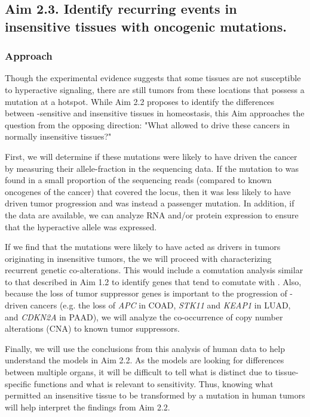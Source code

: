 
\subsection*{Aim 2.3. Identify recurring events in insensitive tissues with oncogenic \KRAS{} mutations.}

\subsubsection*{Approach}

Though the experimental evidence suggests that some tissues are not susceptible to hyperactive \kras{} signaling, there are still tumors from these locations that possess a mutation at a \KRAS{} hotspot.
While Aim 2.2 proposes to identify the differences between \KRAS{}-sensitive and insensitive tissues in homeostasis, this Aim approaches the question from the opposing direction: "What allowed \KRAS{} to drive these cancers in normally insensitive tissues?"

First, we will determine if these mutations were likely to have driven the cancer by measuring their allele-fraction in the sequencing data.
If the mutation to \KRAS{} was found in a small proportion of the sequencing reads (compared to known oncogenes of the cancer) that covered the \KRAS{} locus, then it was less likely to have driven tumor progression and was instead a passenger mutation.
In addition, if the data are available, we can analyze RNA and/or protein expression to ensure that the hyperactive allele was expressed.

If we find that the \KRAS{} mutations were likely to have acted as drivers in tumors originating in insensitive tumors, the we will proceed with characterizing recurrent genetic co-alterations.
This would include a comutation analysis similar to that described in Aim 1.2 to identify genes that tend to comutate with \KRAS{}.
Also, because the loss of tumor suppressor genes is important to the progression of \KRAS{}-driven cancers (e.g. the loss of \emph{APC} in COAD, \emph{STK11} and \emph{KEAP1} in LUAD, and \emph{CDKN2A} in PAAD), we will analyze the co-occurrence of copy number alterations (CNA) to known tumor suppressors.

Finally, we will use the conclusions from this analysis of human data to help understand the models in Aim 2.2.
As the models are looking for differences between multiple organs, it will be difficult to tell what is distinct due to tissue-specific functions and what is relevant to \KRAS{} sensitivity.
Thus, knowing what permitted an insensitive tissue to be transformed by a \KRAS{} mutation in human tumors will help interpret the findings from Aim 2.2.

